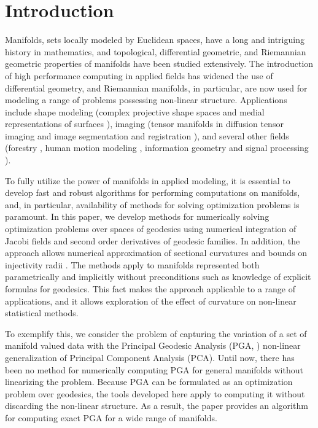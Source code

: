 \documentclass[final]{svjour3}
\begin{document}
\section{Introduction}
\label{introduction}
Manifolds, sets locally modeled by Euclidean spaces, have a long and intriguing
history in mathematics, and topological, differential geometric, and Riemannian
geometric properties of manifolds have been studied extensively. The introduction of
high performance computing in applied fields has widened the use of differential
geometry,
and Riemannian manifolds, in particular, are now used for modeling a range
of problems possessing non-linear structure. Applications include shape modeling 
(complex projective shape spaces
\cite{kendall_shape_1984} and medial representations of surfaces
\cite{blum_transformation_1967,joshi_multiscale_2002}),
imaging (tensor manifolds in diffusion tensor imaging 
\cite{fletcher_principal_2004,fletcher_riemannian_2007,pennec_riemannian_2006} and
image segmentation and registration \cite{caselles_geodesic_1995,pennec_feature-based_1998}),
and several other fields (forestry \cite{huckemann_intrinsic_2010}, human motion
modeling \cite{sminchisescu_generative_2004,urtasun_priors_2005},
information geometry and signal processing \cite{yang_means_2011}).

To fully utilize the power of manifolds in applied modeling, it is essential to develop fast and
robust algorithms for performing computations on manifolds, and, in particular,
availability of methods for solving optimization problems is paramount. In this paper, 
we develop methods for numerically solving optimization problems over spaces of
geodesics using numerical integration of Jacobi fields and second order derivatives of
geodesic families.
In addition, the approach allows numerical approximation of sectional curvatures
and bounds on injectivity
radii \cite{huckemann_intrinsic_2010}. The methods apply to
manifolds represented both parametrically and implicitly without 
preconditions such as knowledge of explicit formulas for geodesics. This fact
makes the approach applicable to a range of applications, and it allows
exploration of the effect of curvature on non-linear statistical
methods.

To exemplify this, we consider the problem of capturing the variation of a set
of manifold valued data with the 
Principal Geodesic Analysis (PGA, \cite{fletcher_principal_2004-1}) non-linear
generalization of Principal Component Analysis (PCA). Until now, there has been no
method for numerically computing PGA for general manifolds without linearizing
the problem. Because PGA can be formulated as an optimization
problem over geodesics, the tools developed here apply to computing
it without discarding the non-linear structure. As a result, the paper 
provides an algorithm for
computing exact PGA for a wide range of manifolds.
\end{document}
